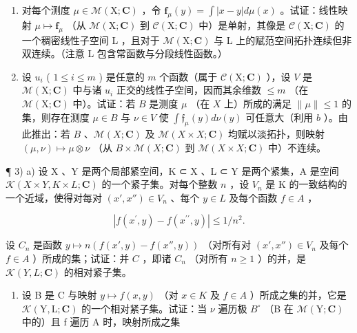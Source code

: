 \begin{enumerate}
\def\labelenumi{\alph{enumi})}
\setcounter{enumi}{1}
\item
  对每个测度 \(\mu \in \mathcal{M}(\mathrm{X};\mathbf{C})\) ，令 \(\mathbf{f}_{\mu}(y) = \int |x - y| d\mu(x)\) 。试证：线性映射 \(\mu \mapsto \mathbf{f}_{\mu}\) （从 \(\mathcal{M}(\mathrm{X};\mathbf{C})\) 到 \(\mathcal{C}(\mathrm{X};\mathbf{C})\) 中）是单射，其像是 \(\mathcal{C}(\mathrm{X};\mathbf{C})\) 的一个稠密线性子空间 L ，且对于 \(\mathcal{M}(\mathrm{X};\mathbf{C})\) 与 L 上的赋范空间拓扑连续但非双连续。（注意 L 包含常函数与分段线性函数。）
\item
  设 \(u_{i}\) ( \(1 \leqslant i \leqslant m\) ) 是任意的 \(m\) 个函数（属于 \(\mathcal{C}(\mathrm{X};\mathbf{C})\) ），设 \(V\) 是 \(\mathcal{M}(\mathrm{X};\mathbf{C})\) 中与诸 \(u_{i}\) 正交的线性子空间，因而其余维数 \(\leqslant m\) （在 \(\mathcal{M}(\mathrm{X};\mathbf{C})\) 中）。试证：若 \(B\) 是测度 \(\mu\) （在 \(X\) 上）所成的满足 \(\| \mu \| \leqslant 1\) 的集，则存在测度 \(\mu \in B\) 与 \(\nu \in V\) 使 \(\int \mathfrak{f}_{\mu}(y)d\nu(y)\) 可任意大（利用 \(b\) ）。由此推出：若 \(B\) 、\(\mathcal{M}(X; \mathbf{C})\) 及 \(\mathcal{M}(X \times X; \mathbf{C})\) 均赋以淡拓扑，则映射 \((\mu, \nu) \mapsto \mu \otimes \nu\) （从 \(B \times \mathcal{M}(X; \mathbf{C})\) 到 \(\mathcal{M}(X \times X; \mathbf{C})\) 中）不连续。
\end{enumerate}

¶ 3) a) 设 X 、Y 是两个局部紧空间，K ⊂ X 、L ⊂ Y 是两个紧集，A 是空间 \(\mathcal{K}(X \times Y, K \times L; \mathbf{C})\) 的一个紧子集。对每个整数 \(n\) ，设 \(V_n\) 是 K 的一致结构的一个近域，使得对每对 \((x', x'') \in V_n\) 、每个 \(y \in L\) 及每个函数 \(f \in A\) ，

\[
\left| f (x ^ {\prime}, y) - f (x ^ {\prime \prime}, y) \right| \leqslant 1 / n ^ {2}.
\]

设 \(C_n\) 是函数 \(y \mapsto n(f(x', y) - f(x'', y))\) （对所有对 \((x', x'') \in V_n\) 及每个 \(f \in A\) ）所成的集；试证：并 \(C\) ，即诸 \(C_n\) （对所有 \(n \geqslant 1\) ）的并，是 \(\mathcal{K}(Y, L; \mathbf{C})\) 的相对紧子集。

\begin{enumerate}
\def\labelenumi{\alph{enumi})}
\setcounter{enumi}{1}
\tightlist
\item
  设 B 是 C 与映射 \(y \mapsto f(x, y)\) （对 \(x \in K\) 及 \(f \in A\) ）所成之集的并，它是 \(\mathcal{K}(\mathrm{Y}, \mathrm{L}; \mathbf{C})\) 的一个相对紧子集。试证：当 \(\nu\) 遍历极 \(B^{\circ}\) （B 在 \(\mathcal{M}(\mathrm{Y}; \mathbf{C})\) 中的）且 f 遍历 A 时，映射所成之集
\end{enumerate}

